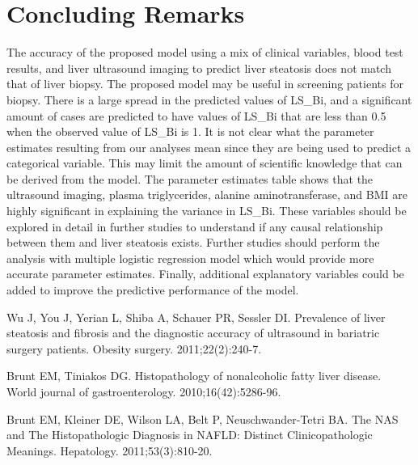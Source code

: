 \documentclass{article}
\begin{document}
\section{Concluding Remarks}
The accuracy of the proposed model using a mix of clinical variables, blood test results, and liver ultrasound imaging to predict liver steatosis does not match that of liver biopsy. The proposed model may be useful in screening patients for biopsy. There is a large spread in the predicted values of LS\_Bi, and a significant amount of cases are predicted to have values of LS\_Bi that are less than 0.5 when the observed value of LS\_Bi is 1. It is not clear what the parameter estimates resulting from our analyses mean since they are being used to predict a categorical variable. This may limit the amount of scientific knowledge that can be derived from the model. The parameter estimates table shows that the ultrasound imaging, plasma triglycerides, alanine aminotransferase, and BMI are highly significant in explaining the variance in LS\_Bi. These variables should be explored in detail in further studies to understand if any causal relationship between them and liver steatosis exists. Further studies should perform the analysis with multiple logistic regression model which would provide more accurate parameter estimates. Finally, additional explanatory variables could be added to improve the predictive performance of the model.

\begin{thebibliography}{99}
	Wu J, You J, Yerian L, Shiba A, Schauer PR, Sessler DI. Prevalence of liver steatosis and fibrosis and the diagnostic accuracy of ultrasound in bariatric surgery patients. Obesity surgery. 2011;22(2):240-7. 
	
	Brunt EM, Tiniakos DG. Histopathology of nonalcoholic fatty liver disease. World journal of gastroenterology. 2010;16(42):5286-96. 
	
	Brunt EM, Kleiner DE, Wilson LA, Belt P, Neuschwander-Tetri BA. The NAS and The Histopathologic Diagnosis in NAFLD: Distinct Clinicopathologic Meanings. Hepatology. 2011;53(3):810-20. 
	
\end{thebibliography}

\end{document}

